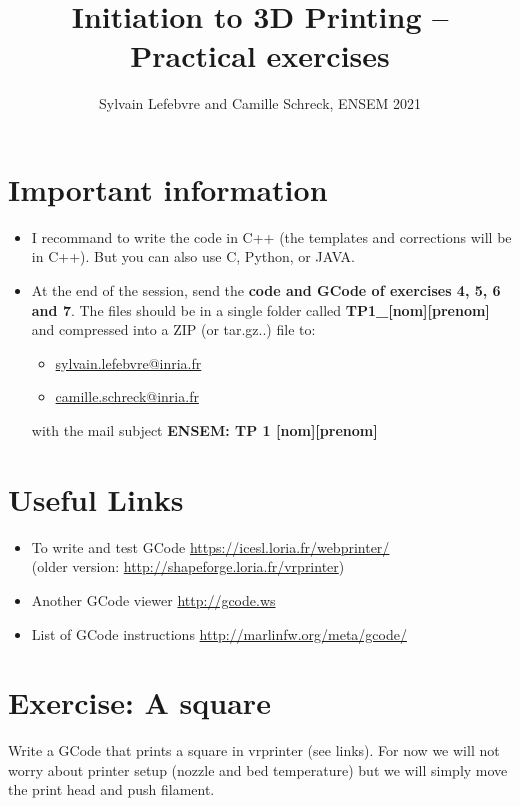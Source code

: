 \documentclass{article}
\date{\displaydate{date}}
\title{Initiation to 3D Printing -- Practical exercises}
\author{Sylvain Lefebvre and Camille Schreck, ENSEM 2021}
\begin{document}
\maketitle

\section{Important information}
\begin{itemize}
    \item I recommand to write the code in C++ (the templates and corrections will be in C++). But you can also use C, Python, or JAVA.
    \item At the end of the session, send the {\bfseries code and GCode of exercises 4, 5, 6 and 7}. The files should be in a single folder called {\bfseries TP1\_[nom][prenom]} and compressed into a ZIP (or tar.gz..) file to:
    \begin{itemize}
        \item \href{mailto:sylvain.lefebvre@inria.fr}{sylvain.lefebvre@inria.fr}
        \item \href{mailto:camille.schreck@inria.fr}{camille.schreck@inria.fr}
    \end{itemize}
    with the mail subject {\bfseries ENSEM: TP 1 [nom][prenom]}
\end{itemize}

\section{Useful Links}

\begin{itemize}
	\item To write and test GCode \url{https://icesl.loria.fr/webprinter/}\\ (older version: \url{http://shapeforge.loria.fr/vrprinter})
	\item Another GCode viewer \url{http://gcode.ws}
	\item List of GCode instructions \url{http://marlinfw.org/meta/gcode/}
\end{itemize}

\section{Exercise: A square}

Write a GCode that prints a square in vrprinter (see links). For now we will not worry about
printer setup (nozzle and bed temperature) but we will simply move the print head and push
filament.
\end{document}
